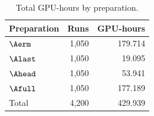 \begin{table}[H]
  \centering
  \caption{Total GPU-hours by preparation.}
  \label{tab:training-gpu-hours}
  \small
  \begin{tabular}{@{}lrr@{}}
    \toprule
    Preparation & Runs & GPU-hours \\
    \midrule
    \(\Aerm\)  & 1,050 & 179.714 \\
    \(\Alast\) & 1,050 & 19.095 \\
    \(\Ahead\) & 1,050 & 53.941 \\
    \(\Afull\) & 1,050 & 177.189 \\
    \midrule
    Total      & 4,200 & 429.939 \\
    \bottomrule
  \end{tabular}
\end{table}
